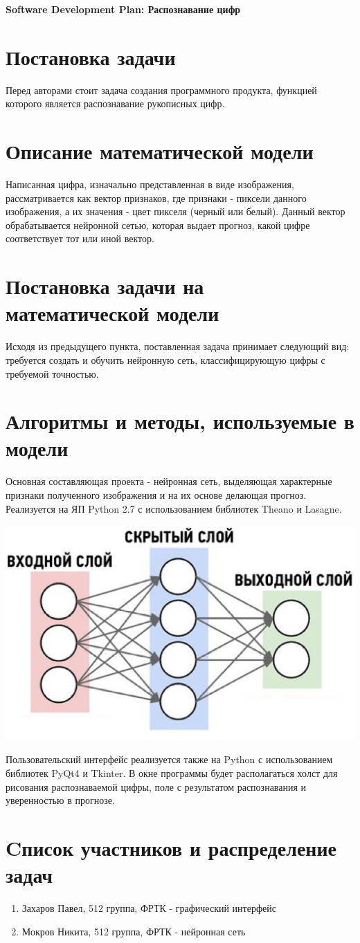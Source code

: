 \documentclass[10pt]{article}
\begin{document}
\begin{center}
{\bf \huge Software Development Plan: Распознавание цифр}
\end{center}
\section{Постановка задачи}
Перед авторами стоит задача создания программного продукта, функцией которого является распознавание рукописных цифр.
\section{Описание математической модели}
Написанная цифра, изначально представленная в виде изображения, рассматривается как вектор признаков, где признаки - пиксели данного изображения, а их значения - цвет пикселя (черный или белый). Данный вектор обрабатывается нейронной сетью, которая выдает прогноз, какой цифре соответствует тот или иной вектор.
\section{Постановка задачи на математической модели}
Исходя из предыдущего пункта, поставленная задача принимает следующий вид: требуется создать и обучить нейронную сеть, классифицирующую цифры с требуемой точностью.
\section{Алгоритмы и методы, используемые в модели}
Основная составляющая проекта - нейронная сеть, выделяющая характерные признаки полученного изображения и на их основе делающая прогноз. Реализуется на ЯП Python 2.7 с использованием библиотек Theano и Lasagne.


\includegraphics[width=0.5\linewidth]{Picture.eps}


Пользовательский интерфейс реализуется также на Python с использованием библиотек PyQt4 и Tkinter. В окне программы будет располагаться холст для рисования распознаваемой цифры, поле с результатом распознавания и уверенностью в прогнозе.
\section{Cписок участников и распределение задач}
\begin{enumerate}
\item Захаров Павел, 512 группа, ФРТК - графический интерфейс
\item Мокров Никита, 512 группа, ФРТК - нейронная сеть
\end{enumerate}
\end{document}
